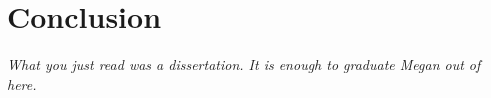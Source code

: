 \chapter{Conclusion}
\label{conclusion}

\emph{What you just read was a dissertation. It is enough to graduate Megan out of here.} 
